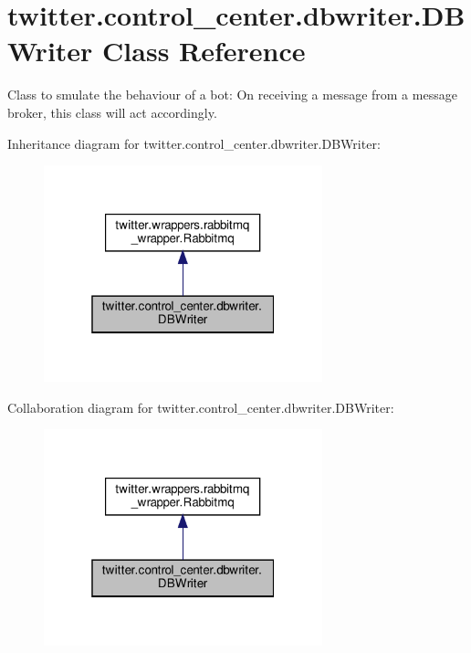 \hypertarget{classtwitter_1_1control__center_1_1dbwriter_1_1DBWriter}{}\section{twitter.\+control\+\_\+center.\+dbwriter.\+D\+B\+Writer Class Reference}
\label{classtwitter_1_1control__center_1_1dbwriter_1_1DBWriter}


Class to smulate the behaviour of a bot\+: On receiving a message from a message broker, this class will act accordingly.  




Inheritance diagram for twitter.\+control\+\_\+center.\+dbwriter.\+D\+B\+Writer\+:\nopagebreak
\begin{figure}[H]
\begin{center}
\leavevmode
\includegraphics[width=229pt]{d3/d96/classtwitter_1_1control__center_1_1dbwriter_1_1DBWriter__inherit__graph}
\end{center}
\end{figure}


Collaboration diagram for twitter.\+control\+\_\+center.\+dbwriter.\+D\+B\+Writer\+:\nopagebreak
\begin{figure}[H]
\begin{center}
\leavevmode
\includegraphics[width=229pt]{d7/d51/classtwitter_1_1control__center_1_1dbwriter_1_1DBWriter__coll__graph}
\end{center}
\end{figure}
